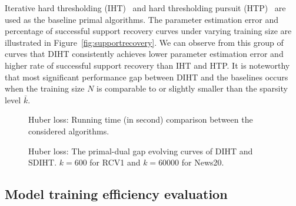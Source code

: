\documentclass[11pt]{article}
\numberwithin{equation}{section}
\numberwithin{table}{section}
\numberwithin{figure}{section}
\begin{document}
Iterative hard thresholding (IHT)~\cite{blumensath2009iterative} and hard thresholding pursuit (HTP)~\cite{foucart2011hard} are used as the baseline primal algorithms. The parameter estimation error and percentage of successful support recovery curves under varying training size are illustrated in Figure~\ref{fig:supportrecovery}. We can observe from this group of curves that DIHT consistently achieves lower parameter estimation error and higher rate of successful support recovery than IHT and HTP. It is noteworthy that most significant performance gap between DIHT and the baselines occurs when the training size $N$ is comparable to or slightly smaller than the sparsity level $\bar{k}$.

\begin{figure*}
\centering
{}
\caption{Huber loss: Running time (in second) comparison between the considered algorithms.}
\label{fig:TimeHuber}
\end{figure*}
\begin{figure*}
\centering
{}
\caption{Huber loss: The primal-dual gap evolving curves of DIHT and SDIHT. $k=600$ for RCV1 and $k=60000$ for News20.}
\label{fig:PDGapHuber}
\end{figure*}
\subsection{Model training efficiency evaluation}
\end{document}

